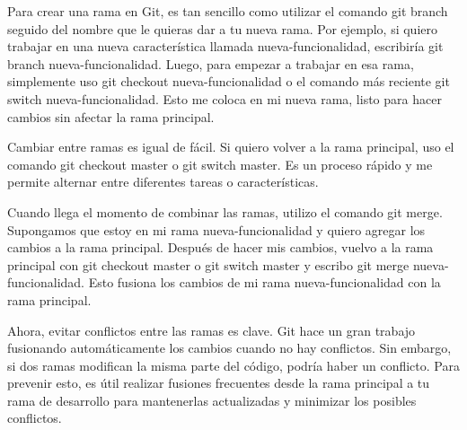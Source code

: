 
Para crear una rama en Git, es tan sencillo como utilizar el comando git branch 
seguido del nombre que le quieras dar a tu nueva rama. Por ejemplo, si quiero 
trabajar en una nueva característica llamada nueva-funcionalidad, escribiría git branch
nueva-funcionalidad. Luego, para empezar a trabajar en esa rama, simplemente 
uso git checkout nueva-funcionalidad o el comando más reciente git switch 
nueva-funcionalidad. Esto me coloca en mi nueva rama, listo para hacer cambios sin 
afectar la rama principal.


Cambiar entre ramas es igual de fácil. Si quiero volver a la rama principal, uso el 
comando git checkout master o git switch master. Es un proceso rápido y me permite 
alternar entre diferentes tareas o características.


Cuando llega el momento de combinar las ramas, utilizo el comando git merge. Supongamos 
que estoy en mi rama nueva-funcionalidad y quiero agregar los cambios a la rama 
principal. Después de hacer mis cambios, vuelvo a la rama principal con git checkout 
master o git switch master y escribo git merge nueva-funcionalidad. Esto fusiona los 
cambios de mi rama nueva-funcionalidad con la rama principal.


Ahora, evitar conflictos entre las ramas es clave. Git hace un gran trabajo fusionando 
automáticamente los cambios cuando no hay conflictos. Sin embargo, si dos ramas 
modifican la misma parte del código, podría haber un conflicto. Para prevenir esto, 
es útil realizar fusiones frecuentes desde la rama principal a tu rama de desarrollo 
para mantenerlas actualizadas y minimizar los posibles conflictos.


